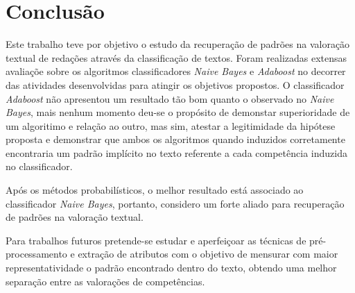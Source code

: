 \section{Conclusão}

Este trabalho teve por objetivo o estudo da recuperação de padrões na valoração 
textual de redações através da classificação de textos. Foram realizadas 
extensas avaliaçõe sobre os algoritmos classificadores \textit{Naive Bayes} e 
\textit{Adaboost} no decorrer das atividades desenvolvidas para atingir os 
objetivos propostos. O classificador \textit{Adaboost} não apresentou um 
resultado tão bom quanto o observado no \textit{Naive Bayes}, mais nenhum 
momento deu-se o propósito de demonstar superioridade de um algoritimo e 
relação ao outro, mas sim, atestar a legitimidade da hipótese proposta e 
demonstrar que ambos os algoritmos quando induzidos corretamente encontraria um 
padrão implícito no texto referente a cada competência induzida no 
classificador. 

Após os métodos probabilísticos, o melhor resultado está associado ao 
classificador \textit{Naive Bayes}, portanto, considero um forte aliado para 
recuperação de padrões na valoração textual.

Para trabalhos futuros pretende-se estudar e aperfeiçoar as técnicas de 
pré-processamento e extração de atributos com o objetivo de mensurar com maior 
representatividade o padrão encontrado dentro do texto, obtendo uma melhor 
separação entre as valorações de competências.